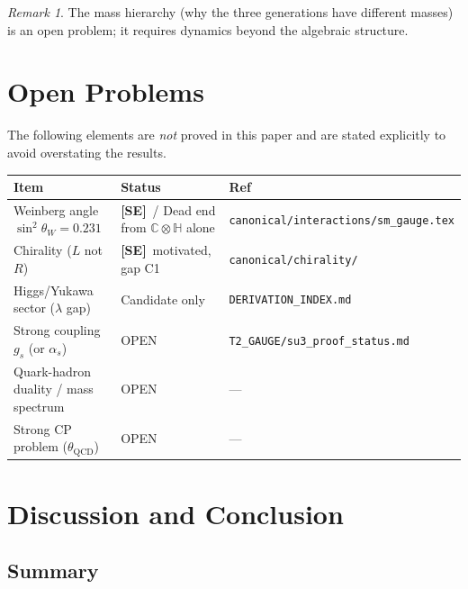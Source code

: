 \documentclass[12pt,a4paper]{article}
\theoremstyle{definition}
\theoremstyle{remark}
\newtheorem{remark}[theorem]{Remark}
\newcommand{\SE}{\textbf{[SE]}}
\newcommand{\Bq}{\mathbb{C}\otimes\mathbb{H}}
\begin{document}
\begin{remark}
The mass hierarchy (why the three generations have different masses) is an
open problem; it requires dynamics beyond the algebraic structure.
\end{remark}

\section{Open Problems}
\label{sec:open}

The following elements are \emph{not} proved in this paper and are stated
explicitly to avoid overstating the results.

\begin{tcolorbox}[colback=orange!5!white,colframe=orange!55!black,
  title=Open Problems (do not affect the main theorem),breakable]
\begin{center}
\begin{tabular}{lll}
\toprule
\textbf{Item} & \textbf{Status} & \textbf{Ref} \\
\midrule
Weinberg angle $\sin^2\theta_W = 0.231$ & \SE\ / Dead end from $\Bq$ alone &
  \texttt{canonical/interactions/sm\_gauge.tex} \\
Chirality ($L$ not $R$) & \SE\ motivated, gap C1 &
  \texttt{canonical/chirality/} \\
Higgs/Yukawa sector ($\lambda$ gap) & Candidate only &
  \texttt{DERIVATION\_INDEX.md} \\
Strong coupling $g_s$ (or $\alpha_s$) & OPEN &
  \texttt{T2\_GAUGE/su3\_proof\_status.md} \\
Quark-hadron duality / mass spectrum & OPEN &
  — \\
Strong CP problem ($\theta_{\mathrm{QCD}}$) & OPEN &
  — \\
\bottomrule
\end{tabular}
\end{center}
\end{tcolorbox}

\section{Discussion and Conclusion}
\label{sec:conclusion}

\subsection{Summary}
\end{document}
